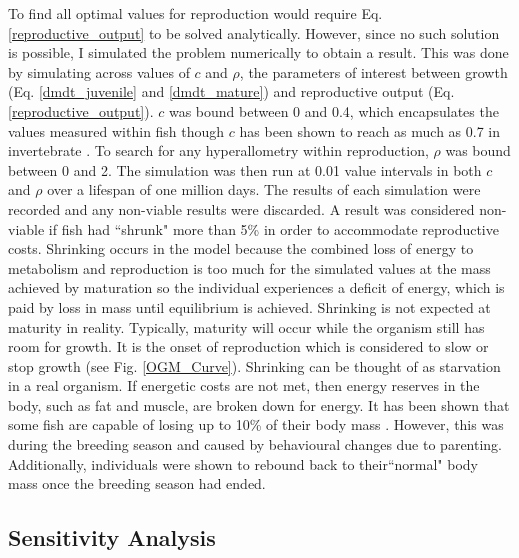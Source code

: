 \documentclass[a4paper, 11pt, hidelinks]{article} %
\begin{document}
	To find all optimal values for reproduction would require Eq. \ref{reproductive_output} to be solved analytically.  However, since no such solution is possible, I simulated the problem numerically to obtain a result.  This was done by simulating across values of $ c $ and $ \rho $, the parameters of interest between growth (Eq. \ref{dmdt_juvenile} and \ref{dmdt_mature}) and reproductive output (Eq. \ref{reproductive_output}).  $ c $ was bound between 0 and 0.4, which encapsulates the values measured within fish \parencite{Benoit2018, Roff1983, Fontoura2009, Lambert2000, Wootton1985} though $ c $ has been shown to reach as much as 0.7 in invertebrate \parencite{Parker2018}.  To search for any hyperallometry within reproduction, $ \rho $ was bound between 0 and 2.  
	The simulation was then run at 0.01 value intervals in both $c$ and $\rho$ over a lifespan of one million days.  The results of each simulation were recorded and any non-viable results were discarded.  A result was considered non-viable if fish had ``shrunk" more than 5\% in order to accommodate reproductive costs.  Shrinking occurs in the model because  the combined loss of energy to metabolism and reproduction is too much for the simulated values at the mass achieved by maturation so the individual experiences a deficit of energy, which is paid by loss in mass until equilibrium is achieved. %
	Shrinking is not expected at maturity in reality.  Typically, maturity will occur while the organism still has room for growth.  It is the onset of reproduction which is considered to slow or stop growth %
	 (see Fig. \ref{OGM_Curve}).  Shrinking can be thought of as starvation in a real organism.  If energetic costs are not met, then energy reserves in the body, such as fat and muscle, are broken down for energy.  It has been shown that some fish are capable of losing up to 10\% of their body mass \parencite{VandenBerghe1992}.  However, this was during the breeding season and caused by behavioural changes due to parenting.  Additionally, individuals were shown to rebound back to their``normal" body mass once the breeding season had ended. %

	
	\subsection{Sensitivity Analysis}
\end{document}
